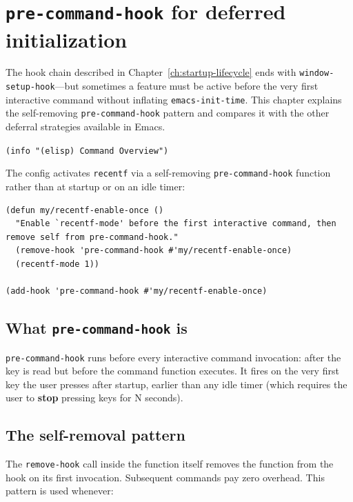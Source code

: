 \chapter{\texttt{pre-command-hook} for deferred initialization}
\label{ch:pre-command-hook}
\minitoc\label{pre-command-hook-for-deferred-initialization}

The hook chain described in Chapter~\ref{ch:startup-lifecycle} ends
with \texttt{window-setup-hook}---but sometimes a feature must be
active before the very first interactive command without inflating
\texttt{emacs-init-time}.  This chapter
explains the self-removing \texttt{pre-command-hook} pattern and
compares it with the other deferral strategies available in Emacs.

\texttt{(info "(elisp) Command Overview")}

The config activates \texttt{recentf} via a self-removing \texttt{pre-command-hook} function rather than at startup or on an idle timer:

\begin{verbatim}
(defun my/recentf-enable-once ()
  "Enable `recentf-mode' before the first interactive command, then
remove self from pre-command-hook."
  (remove-hook 'pre-command-hook #'my/recentf-enable-once)
  (recentf-mode 1))

(add-hook 'pre-command-hook #'my/recentf-enable-once)
\end{verbatim}

\section{What \texttt{pre-command-hook} is}\label{what-pre-command-hook-is}

\texttt{pre-command-hook} runs before every interactive command invocation: after the key is read but before the command function executes. It fires on the very first key the user presses after startup, earlier than any idle timer (which requires the user to \textbf{stop} pressing keys for N seconds).

\section{The self-removal pattern}\label{the-self-removal-pattern}

The \texttt{remove-hook} call inside the function itself removes the function from the hook on its first invocation. Subsequent commands pay zero overhead. This pattern is used whenever:


